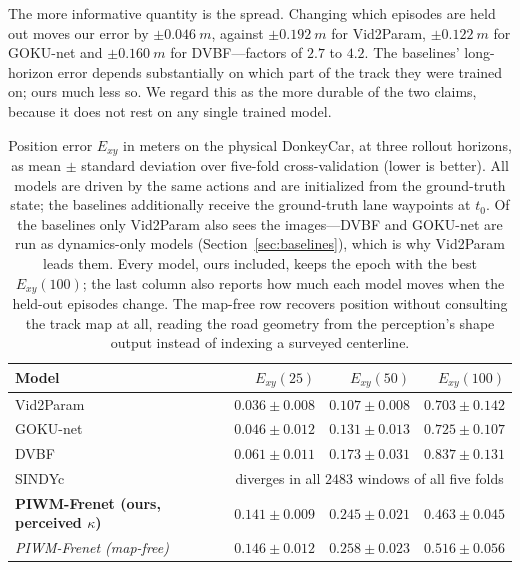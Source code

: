 \documentclass[preprint,12pt]{elsarticle}
\begin{document}
The more informative quantity is the spread. Changing which episodes are held out
moves our error by $\pm\SI{0.046}{m}$, against $\pm\SI{0.192}{m}$ for Vid2Param,
$\pm\SI{0.122}{m}$ for GOKU-net and $\pm\SI{0.160}{m}$ for DVBF---factors of
$2.7$ to $4.2$. The baselines' long-horizon error depends substantially on which part of
the track they were trained on; ours much less so. We regard this as the more
durable of the two claims, because it does not rest on any single trained model.

\begin{table}[t]
\centering
\caption{Position error $E_{xy}$ in meters on the physical DonkeyCar, at three
rollout horizons, as mean $\pm$ standard deviation over five-fold cross-validation (lower is
better). All models are driven by the same actions and are initialized from the
ground-truth state; the baselines additionally receive the ground-truth lane
waypoints at $t_0$. Of the baselines only Vid2Param also sees the images---DVBF
and GOKU-net are run as dynamics-only models (Section~\ref{sec:baselines}), which is
why Vid2Param leads them. Every model, ours included, keeps the epoch with the best
$E_{xy}(100)$; the last column also reports how much each model moves when the
held-out episodes change. The map-free row recovers position without consulting the
track map at all, reading the road geometry from the perception's shape output
instead of indexing a surveyed centerline.}
\label{tab:donkey_main}
\footnotesize
\setlength{\tabcolsep}{3.4pt}
\begin{tabular}{lrrr}
\toprule
Model & $E_{xy}(25)$ & $E_{xy}(50)$ & $E_{xy}(100)$ \\
\midrule
Vid2Param~\cite{asenov2019vid2param}   & $\mathbf{0.036 \pm 0.008}$ & $\mathbf{0.107 \pm 0.008}$ & $0.703 \pm 0.142$ \\
GOKU-net~\cite{linial_generative_2021}  & $0.046 \pm 0.012$ & $0.131 \pm 0.013$ & $0.725 \pm 0.107$ \\
DVBF~\cite{karl2016deep}               & $0.061 \pm 0.011$ & $0.173 \pm 0.031$ & $0.837 \pm 0.131$ \\
SINDYc~\cite{BRUNTON2016710}           & \multicolumn{3}{c}{diverges in all $2483$ windows of all five folds} \\
\midrule
\textbf{PIWM-Frenet (ours, perceived $\kappa$)} & $0.141 \pm 0.009$ & $0.245 \pm 0.021$ & $\mathbf{0.463 \pm 0.045}$ \\
\emph{PIWM-Frenet (map-free)} & \emph{$0.146 \pm 0.012$} & \emph{$0.258 \pm 0.023$} & \emph{$0.516 \pm 0.056$} \\
\bottomrule
\end{tabular}
\end{table}
\end{document}
